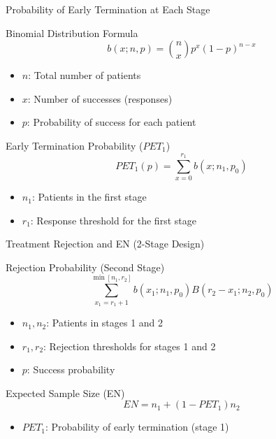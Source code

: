 \documentclass[xcolor=red]{beamer}
\begin{document}
\begin{frame}{Probability of Early Termination at Each Stage}
\begin{block}{Binomial Distribution Formula}
\footnotesize
\[
b(x; n, p) = \binom{n}{x} p^x (1 - p)^{n - x}
\]
\end{block}
\vspace{-0.2cm}
\scriptsize
\begin{itemize} %
    \item \( n \): Total number of patients
    \item \( x \): Number of successes (responses)
    \item \( p \): Probability of success for each patient
\end{itemize}
\vspace{-0.2cm}

\begin{block}{Early Termination Probability (\(PET_1\))}
\footnotesize
\[
PET_1(p) = \sum_{x=0}^{r_1} b(x; n_1, p_0)
\]
\end{block}
\vspace{-0.2cm}
\scriptsize
\begin{itemize}
    \item \( n_1 \): Patients in the first stage
    \item \( r_1 \): Response threshold for the first stage
\end{itemize}
\end{frame}




\begin{frame}{Treatment Rejection and EN (2-Stage Design)}
\begin{block}{Rejection Probability (Second Stage)}
\[
\sum_{x_1 = r_1 + 1}^{\min[n_1, r_2]} b(x_1; n_1, p_0) B(r_2 - x_1; n_2, p_0)
\]
\end{block}

\begin{itemize}
\scriptsize
    \item \( n_1, n_2 \): Patients in stages 1 and 2
    \item \( r_1, r_2 \): Rejection thresholds for stages 1 and 2
    \item \( p \): Success probability
\end{itemize}

\begin{block}{Expected Sample Size (EN)}
\[
EN = n_1 + (1 - PET_1) n_2
\]
\end{block}
\begin{itemize}
\scriptsize
    \item \( PET_1 \): Probability of early termination (stage 1)
\end{itemize}
\end{frame}
\end{document}
